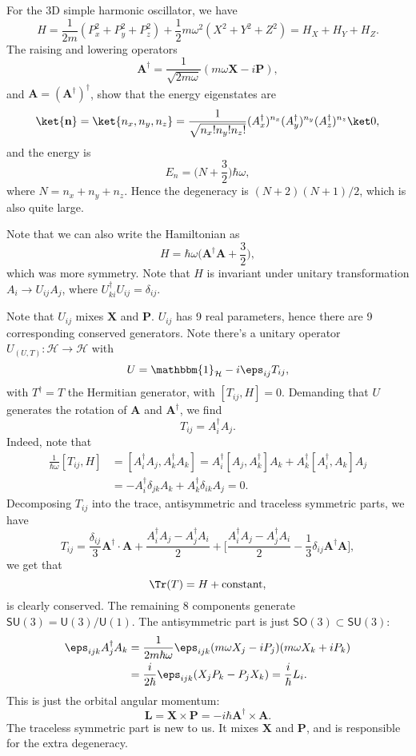 \documentclass[12pt]{article}
\begin{document}
For the 3D simple harmonic oscillator, we have
\[
H = \frac{1}{2m}(P_x^2 + P_y^2 + P_z^2) + \frac{1}{2}m\omega^2(X^2 + Y^2 + Z^2) = H_X + H_Y + H_Z.
\]
The raising and lowering operators
\[
	\mathbf{A}^{\dagger} = \frac{1}{\sqrt{2m \omega}} (m\omega \mathbf{X} - i \mathbf{P}),
\]
and $\mathbf{A} = (\mathbf{A}^{\dagger})^{\dagger}$, show that the energy eigenstates are
\[
	\ket{\mathbf{n}} = \ket{n_x, n_y, n_z} = \frac{1}{\sqrt{n_x!n_y!n_z!}}(A_x^{\dagger})^{n_x}(A_y^{\dagger})^{n_y}(A_z^{\dagger})^{n_z} \ket 0,
\]
and the energy is
\[
E_n = \biggl(N + \frac{3}{2}\biggr) \hbar \omega,
\]
where $N = n_x + n_y + n_z$. Hence the degeneracy is $(N+2)(N+1)/2$, which is also quite large.


Note that we can also write the Hamiltonian as
\[
H = \hbar \omega \biggl(\mathbf{A}^{\dagger} \mathbf{A} + \frac{3}{2} \biggr),
\]
which was more symmetry. Note that $H$ is invariant under unitary transformation $A_i \to U_{ij} A_j$, where $U^{\dagger}_{ki} U_{ij} = \delta_{ij}$.

Note that $U_{ij}$ mixes $\mathbf{X}$ and $\mathbf{P}$. $U_{ij}$ has 9 real parameters, hence there are 9 corresponding conserved generators. Note there's a unitary operator $U_{(U, T)} : \mathcal{H} \to \mathcal{H}$ with
\[
U = \mathbbm{1}_{\mathcal{H}} - i \eps_{ij} T_{ij},
\]
with $T^{\dagger} = T$ the Hermitian generator, with $[T_{ij}, H] = 0$. Demanding that $U$ generates the rotation of $\mathbf{A}$ and $\mathbf{A}^{\dagger}$, we find
\[
T_{ij} = A_{i}^{\dagger} A_j.
\]
Indeed, note that
\begin{align*}
	\frac{1}{\hbar \omega} [T_{ij}, H] &= [A_i^{\dagger} A_j, A_k^{\dagger} A_k] = A_i^{\dagger} [A_j, A_k^{\dagger}] A_k + A_k^{\dagger} [A_i^{\dagger}, A_k] A_j\\
					   &= - A_i^{\dagger} \delta_{jk} A_k + A_k^{\dagger} \delta_{ik} A_j = 0.
\end{align*}
Decomposing $T_{ij}$ into the trace, antisymmetric and traceless symmetric parts, we have
\[
	T_{ij} = \frac{\delta_{ij}}{3} \mathbf{A}^{\dagger} \cdot \mathbf{A} + \frac{A_i^{\dagger} A_j - A_j^{\dagger} A_i}{2} + \biggl[ \frac{A_i^{\dagger} A_j - A_j^{\dagger} A_i}{2} - \frac{1}{3} \delta_{ij} \mathbf{A}^{\dagger} \mathbf{A} \biggr],
\]
we get that
\[
	\Tr(T) = H + \text{constant},
\]
is clearly conserved. The remaining 8 components generate $\mathsf{SU}(3) = \mathsf{U}(3)/\mathsf{U}(1)$. The antisymmetric part is just $\mathsf{SO}(3) \subset \mathsf{SU}(3)$:
\begin{align*}
	\eps_{ijk} A_j^{\dagger} A_k &= \frac{1}{2m \hbar \omega} \eps_{ijk}(m \omega X_j - i P_j)(m \omega X_k + i P_k) \\
				     &= \frac{i}{2\hbar} \eps_{ijk} (X_j P_k - P_j X_k) = \frac{i}{\hbar} L_i.
\end{align*}
This is just the orbital angular momentum:
\[
\mathbf{L} = \mathbf{X} \times \mathbf{P} = -i \hbar \mathbf{A}^{\dagger} \times \mathbf{A}.
\]
The traceless symmetric part is new to us. It mixes $\mathbf{X}$ and $\mathbf{P}$, and is responsible for the extra degeneracy.
\end{document}
